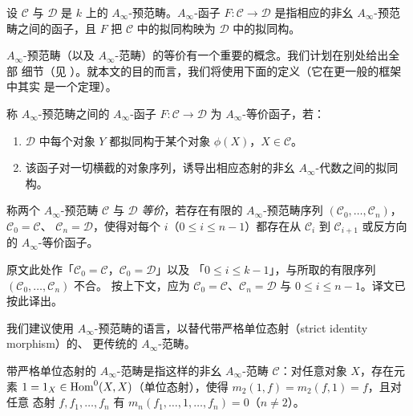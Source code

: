 \begin{dfn}
设 $\mathcal{C}$ 与 $\mathcal{D}$ 是 $k$ 上的 $A_\infty$-预范畴。$A_\infty$-函子
$F\colon\mathcal{C}\to\mathcal{D}$ 是指相应的非幺 $A_\infty$-预范畴之间的函子，且 $F$
把 $\mathcal{C}$ 中的拟同构映为 $\mathcal{D}$ 中的拟同构。
\end{dfn}

$A_\infty$-预范畴（以及 $A_\infty$-范畴）的等价有一个重要的概念。我们计划在别处给出全部
细节（见 \cite{KoS}）。就本文的目的而言，我们将使用下面的定义（它在更一般的框架中其实
是一个定理）。

\begin{dfn}
称 $A_\infty$-预范畴之间的 $A_\infty$-函子 $F\colon\mathcal{C}\to\mathcal{D}$ 为
$A_\infty$-等价函子，若：
\begin{enumerate}[label=\alph*),leftmargin=2.2em,itemsep=1pt,topsep=2pt]
\item $\mathcal{D}$ 中每个对象 $Y$ 都拟同构于某个对象 $\phi(X)$，$X\in\mathcal{C}$。
\item 该函子对一切横截的对象序列，诱导出相应态射的非幺 $A_\infty$-代数之间的拟同构。
\end{enumerate}
\end{dfn}

\begin{dfn}
称两个 $A_\infty$-预范畴 $\mathcal{C}$ 与 $\mathcal{D}$ \emph{等价}，若存在有限的
$A_\infty$-预范畴序列 $(\mathcal{C}_0,\dots,\mathcal{C}_n)$，$\mathcal{C}_0=\mathcal{C}$、
$\mathcal{C}_n=\mathcal{D}$，使得对每个 $i$（$0\le i\le n-1$）都存在从 $\mathcal{C}_i$
到 $\mathcal{C}_{i+1}$ 或反方向的 $A_\infty$-等价函子。
\end{dfn}

\begin{yizhu}[原文的一处笔误]
原文此处作「$\mathcal{C}_0=\mathcal{C}$，$\mathcal{C}_0=\mathcal{D}$」以及
「$0\le i\le k-1$」，与所取的有限序列 $(\mathcal{C}_0,\dots,\mathcal{C}_n)$ 不合。
按上下文，应为 $\mathcal{C}_0=\mathcal{C}$、$\mathcal{C}_n=\mathcal{D}$ 与
$0\le i\le n-1$。译文已按此译出。
\end{yizhu}

我们建议使用 $A_\infty$-预范畴的语言，以替代带严格单位态射（strict identity morphism）的、
更传统的 $A_\infty$-范畴。

\begin{dfn}
带严格单位态射的 $A_\infty$-范畴是指这样的非幺 $A_\infty$-范畴 $\mathcal{C}$：对任意对象
$X$，存在元素 $1=1_X\in\operatorname{Hom}^0(X,X)$（单位态射），使得 $m_2(1,f)=m_2(f,1)=f$，且对任意
态射 $f,f_1,\dots,f_n$ 有 $m_n(f_1,\dots,1,\dots,f_n)=0$（$n\ne2$）。
\end{dfn}

